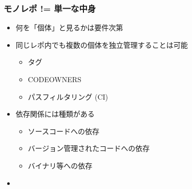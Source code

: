 \begin{frame}
    \frametitle{モノレポ != 単一な中身}
    \begin{itemize}
        \item<2-> 何を「個体」と見るかは要件次第
        \item<3-> 同じレポ内でも複数の個体を独立管理することは可能
        \begin{itemize}
            \item<4-> タグ
            \item<5-> CODEOWNERS
            \item<6-> パスフィルタリング (CI)
        \end{itemize}
        \item<7-> 依存関係には種類がある
        \begin{itemize}
            \item<8-> ソースコードへの依存
            \item<9-> バージョン管理されたコードへの依存
            \item<10-> バイナリ等への依存
        \end{itemize}
        \item<11-> 
    \end{itemize}
\end{frame}
